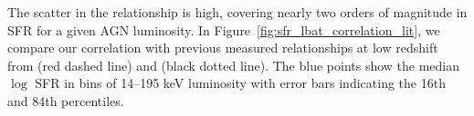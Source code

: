 \documentclass[fleqn, usenatbib]{mnras}
\newcommand{\herschel}{\emph{Herschel}}
\begin{document}



The scatter in the relationship is high, covering nearly two orders of magnitude in SFR for a given AGN luminosity. In Figure~\ref{fig:sfr_lbat_correlation_lit}, we compare our correlation with previous measured relationships at low redshift from \citet{Rosario:2012fr} (red dashed line) and \citet{Netzer:2009lr} (black dotted line). The blue points show the median $\log$ SFR in bins of 14--195 keV luminosity with error bars indicating the 16th and 84th percentiles. 
\end{document}
